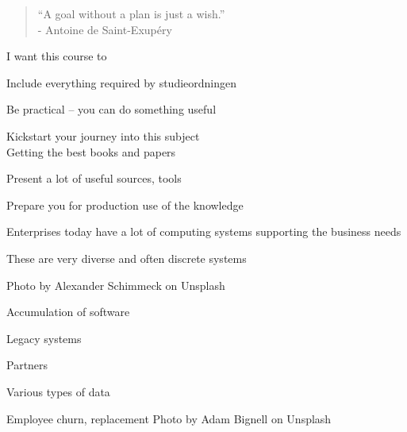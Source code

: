\documentclass[Screen16to9,17pt]{foils}
\begin{document}


\begin{quote}
  “A goal without a plan is just a wish.”\\
  - Antoine de Saint-Exupéry
\end{quote}

I want this course to
\begin{list2}
\item Include everything required by studieordningen
\item Be practical -- you can do something useful
\item Kickstart your journey into this subject\\
Getting the best books and papers
\item Present a lot of useful sources, tools
\item Prepare you for production use of the knowledge
\end{list2}






\begin{list2}
\item Enterprises today have a lot of computing systems supporting the business needs
\item These are very diverse and often discrete systems
\end{list2}

\hfill Photo by Alexander Schimmeck on Unsplash



\begin{list2}
\item Accumulation of software
\item Legacy systems
\item Partners
\item Various types of data
\item Employee churn, replacement \hfill Photo by Adam Bignell on Unsplash
\end{list2}



\end{document}
